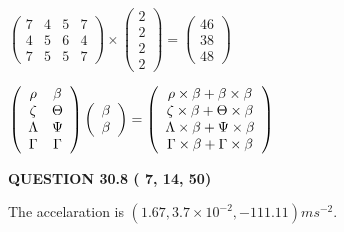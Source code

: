 \documentclass[12pt]{article}
\begin{document}
 
$\left( \begin{array}{ccccccccccccccc}
           7 & 
           4 & 
           5 & 
           7 \\ 
           4 & 
           5 & 
           6 & 
           4 \\ 
           7 & 
           5 & 
           5 & 
           7
\end{array}\right) \times
\left( \begin{array}{c}
           2 \\ 
           2 \\ 
           2 \\ 
           2
\end{array}\right)  =
\left( \begin{array}{c}
          46 \\ 
          38 \\ 
          48
\end{array}\right)  $
 
$  %
 \left( \begin{array}
 {
 c
 c
 }
 \rho & 
 \beta \\ 
                    \zeta & 
 \Theta \\ 
 \Lambda & 
 \Psi \\ 
 \Gamma & 
 \Gamma
 \end{array} \right)
 \left( \begin{array}
 {
 c
 }
 \beta \\ 
 \beta
 \end{array} \right)
=
  \left( \begin{array}
 {
 c
 }
 \rho \times  \beta   +  \beta \times  \beta \\ 
                    \zeta \times  \beta   +  \Theta \times  \beta \\ 
 \Lambda \times  \beta   +  \Psi \times  \beta \\ 
 \Gamma \times  \beta   +  \Gamma \times  \beta
 \end{array} \right)
$
 
 
 
  
\vspace{0.2in}
  
{\textbf{\Large{QUESTION
30.8 
 (          7,         14,         50)
}}}
  
  
 
 
\noindent{}
 
 
  The accelaration is $  %
(
1.67,
3.7 \times 10^{-2},
-111.11)
ms^{-2} $.
 
\end{document}
